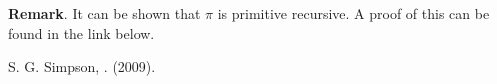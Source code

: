 \documentclass[12pt]{article}
\begin{document}
\textbf{Remark}.  It can be shown that $\pi$ is primitive recursive.  A proof of this can be found in the link below.

\begin{thebibliography}{9}
 S. G. Simpson, . (2009).
\end{thebibliography}
\end{document}

